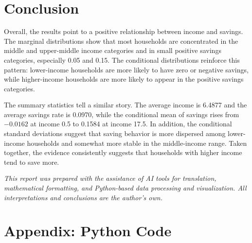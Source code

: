\documentclass[12pt]{article}
\newcommand{\x}{40pt}
\begin{document}
\vspace{\x}
\section*{Conclusion}

Overall, the results point to a positive relationship between income and savings. The marginal distributions show that most households are concentrated in the middle and upper-middle income categories and in small positive savings categories, especially 0.05 and 0.15. The conditional distributions reinforce this pattern: lower-income households are more likely to have zero or negative savings, while higher-income households are more likely to appear in the positive savings categories.

The summary statistics tell a similar story. The average income is 6.4877 and the average savings rate is 0.0970, while the conditional mean of savings rises from $-0.0162$ at income 0.5 to 0.1584 at income 17.5. In addition, the conditional standard deviations suggest that saving behavior is more dispersed among lower-income households and somewhat more stable in the middle-income range. Taken together, the evidence consistently suggests that households with higher income tend to save more.

\vspace{20em}
\noindent
\textit{This report was prepared with the assistance of AI tools for translation, mathematical formatting, and Python-based data processing and visualization. All interpretations and conclusions are the author’s own.}



\appendix
\section*{Appendix: Python Code}
\end{document}
